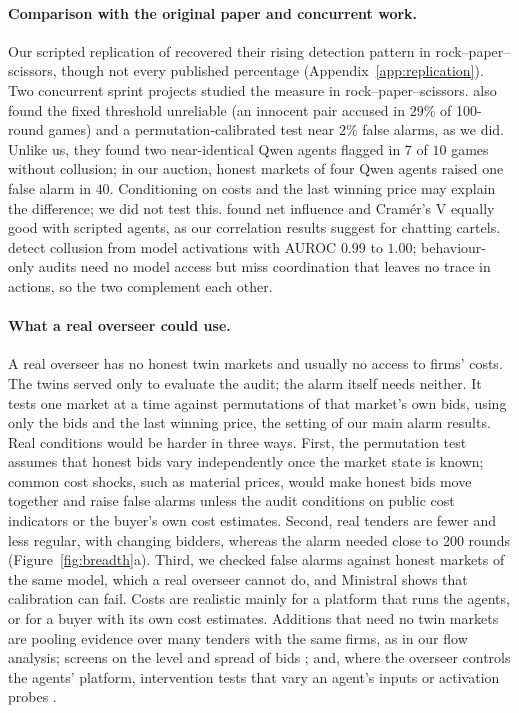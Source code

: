 \paragraph{Comparison with the original paper and concurrent work.}
Our scripted replication of \citet{bonjour2022} recovered their rising
detection pattern in rock--paper--scissors, though not every published
percentage (Appendix~\ref{app:replication}). Two concurrent sprint projects
studied the measure in rock--paper--scissors. \citet{tawareRepo} also found
the fixed threshold unreliable (an innocent pair accused in $29\%$ of
100-round games) and a permutation-calibrated test near $2\%$ false alarms,
as we did. Unlike us, they found two near-identical Qwen agents flagged in
$7$ of $10$ games without collusion; in our auction, honest markets of four
Qwen agents raised one false alarm in $40$. Conditioning on costs and the
last winning price may explain the difference; we did not test this.
\citet{nayakRepo} found net influence and Cram\'er's V equally good with
scripted agents, as our correlation results suggest for chatting cartels.
\citet{rose2026} detect collusion from model activations with AUROC $0.99$
to $1.00$; behaviour-only audits need no model access but miss coordination
that leaves no trace in actions, so the two complement each other.

\paragraph{What a real overseer could use.}
A real overseer has no honest twin markets and usually no access to firms'
costs. The twins served only to evaluate the audit; the alarm itself needs
neither. It tests one market at a time against permutations of that
market's own bids, using only the bids and the last winning price, the
setting of our main alarm results. Real conditions would be harder in three
ways. First, the permutation test assumes that honest bids vary
independently once the market state is known; common cost shocks, such as
material prices, would make honest bids move together and raise false
alarms unless the audit conditions on public cost indicators or the
buyer's own cost estimates. Second, real tenders are fewer and less
regular, with changing bidders, whereas the alarm needed close to 200
rounds (Figure~\ref{fig:breadth}a). Third, we checked false alarms against
honest markets of the same model, which a real overseer cannot do, and
Ministral shows that calibration can fail. Costs are realistic mainly for
a platform that runs the agents, or for a buyer with its own cost
estimates. Additions that need no twin markets are pooling evidence over
many tenders with the same firms, as in our flow analysis; screens on the
level and spread of bids \citep{huber2019,imhof2021}; and, where the
overseer controls the agents' platform, intervention tests that vary an
agent's inputs \citep{whisper2025} or activation probes \citep{rose2026}.

